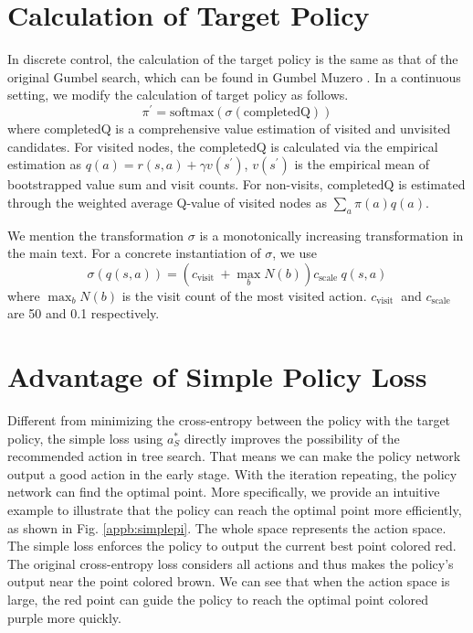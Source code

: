 \section{Calculation of Target Policy}
\label{cal_ip}

In discrete control, the calculation of the target policy is the same as that of the original Gumbel search, which can be found in Gumbel Muzero \citep{danihelka2021policy}.
In a continuous setting, we modify the calculation of target policy as follows.
\begin{equation}
    \pi^{\prime}=\text{softmax}(\sigma(\text{completedQ}))
\end{equation}
where completedQ is a comprehensive value estimation of visited and unvisited candidates. For visited nodes, the completedQ is calculated via the empirical estimation as $q(a)=r(s,a)+\gamma v(s^\prime)$, $v(s^\prime)$ is the empirical mean of bootstrapped value sum and visit counts. For non-visits, $\text{completedQ}$ is estimated through the weighted average Q-value of visited nodes as $\sum_{a}\pi(a)q(a)$.  

We mention the transformation $\sigma$ is a monotonically increasing transformation in the main text. For a concrete instantiation of $\sigma$, we use
\begin{equation}
\sigma(q(s,a))=\left(c_{\text {visit }}+\max _b N(b)\right) c_{\text {scale }}q(s,a)
\end{equation}
where $\max _b N(b)$ is the visit count of the most visited action. $c_{\text {visit }}$ and $c_{\text {scale }}$ are 50 and 0.1 respectively.


\section{Advantage of Simple Policy Loss}
\label{simplepi}

Different from minimizing the cross-entropy between the policy with the target policy, the simple loss using $a^*_S$ directly improves the possibility of the recommended action in tree search. That means we can make the policy network output a good action in the early stage. With the iteration repeating, the policy network can find the optimal point. More specifically, we provide an intuitive example to illustrate that the policy can reach the optimal point more efficiently, as shown in Fig. \ref{appb:simplepi}. The whole space represents the action space. The simple loss enforces the policy to output the current best point colored red. The original cross-entropy loss considers all actions and thus makes the policy's output near the point colored brown. We can see that when the action space is large, the red point can guide the policy to reach the optimal point colored purple more quickly.

